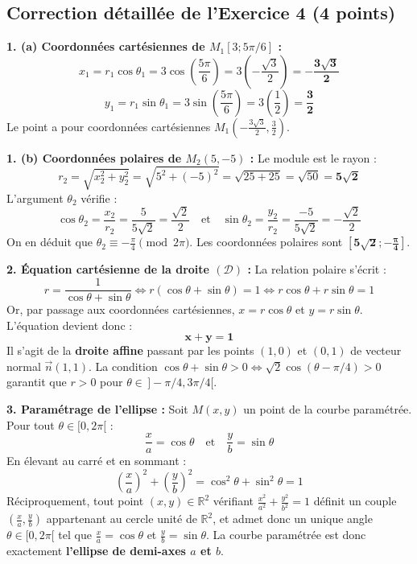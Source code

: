 \documentclass[11pt,a4paper]{article}
\newcommand{\R}{\mathbb{R}}
\begin{document}
\vspace{0.4cm}

\subsection*{Correction détaillée de l'Exercice 4 \hfill (4 points)}

\begin{correctionbox}
\textbf{1. (a) Coordonnées cartésiennes de $M_1[3; 5\pi/6]$ :}
\[
x_1 = r_1 \cos\theta_1 = 3 \cos\left(\frac{5\pi}{6}\right) = 3 \left(-\frac{\sqrt{3}}{2}\right) = \mathbf{-\frac{3\sqrt{3}}{2}}
\]
\[
y_1 = r_1 \sin\theta_1 = 3 \sin\left(\frac{5\pi}{6}\right) = 3 \left(\frac{1}{2}\right) = \mathbf{\frac{3}{2}}
\]
Le point a pour coordonnées cartésiennes $M_1\left(-\frac{3\sqrt{3}}{2}, \frac{3}{2}\right)$.

\textbf{1. (b) Coordonnées polaires de $M_2(5, -5)$ :}
Le module est le rayon :
\[
r_2 = \sqrt{x_2^2 + y_2^2} = \sqrt{5^2 + (-5)^2} = \sqrt{25 + 25} = \sqrt{50} = \mathbf{5\sqrt{2}}
\]
L'argument $\theta_2$ vérifie :
\[
\cos\theta_2 = \frac{x_2}{r_2} = \frac{5}{5\sqrt{2}} = \frac{\sqrt{2}}{2} \quad \text{et} \quad \sin\theta_2 = \frac{y_2}{r_2} = \frac{-5}{5\sqrt{2}} = -\frac{\sqrt{2}}{2}
\]
On en déduit que $\theta_2 \equiv -\frac{\pi}{4} \pmod{2\pi}$. Les coordonnées polaires sont $\mathbf{\left[5\sqrt{2}; -\frac{\pi}{4}\right]}$.

\textbf{2. Équation cartésienne de la droite $(\mathcal{D})$ :}
La relation polaire s'écrit :
\[
r = \frac{1}{\cos\theta + \sin\theta} \iff r(\cos\theta + \sin\theta) = 1 \iff r\cos\theta + r\sin\theta = 1
\]
Or, par passage aux coordonnées cartésiennes, $x = r\cos\theta$ et $y = r\sin\theta$.
L'équation devient donc :
\[
\mathbf{x + y = 1}
\]
Il s'agit de la \textbf{droite affine} passant par les points $(1, 0)$ et $(0, 1)$ de vecteur normal $\vec{n}(1, 1)$. La condition $\cos\theta + \sin\theta > 0 \iff \sqrt{2}\cos(\theta - \pi/4) > 0$ garantit que $r > 0$ pour $\theta \in \,]-\pi/4, 3\pi/4[$.

\textbf{3. Paramétrage de l'ellipse :}
Soit $M(x, y)$ un point de la courbe paramétrée. Pour tout $\theta \in [0, 2\pi[$ :
\[
\frac{x}{a} = \cos\theta \quad \text{et} \quad \frac{y}{b} = \sin\theta
\]
En élevant au carré et en sommant :
\[
\left(\frac{x}{a}\right)^2 + \left(\frac{y}{b}\right)^2 = \cos^2\theta + \sin^2\theta = 1
\]
Réciproquement, tout point $(x, y) \in \R^2$ vérifiant $\frac{x^2}{a^2} + \frac{y^2}{b^2} = 1$ définit un couple $\left(\frac{x}{a}, \frac{y}{b}\right)$ appartenant au cercle unité de $\R^2$, et admet donc un unique angle $\theta \in [0, 2\pi[$ tel que $\frac{x}{a} = \cos\theta$ et $\frac{y}{b} = \sin\theta$.
La courbe paramétrée est donc exactement \textbf{l'ellipse de demi-axes $a$ et $b$}.
\end{correctionbox}
\end{document}
